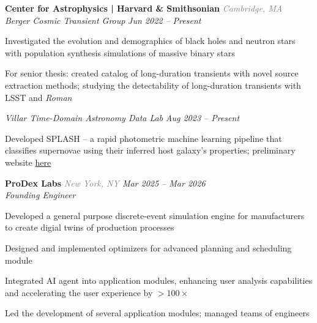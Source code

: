 \documentclass[12pt,letterpaper]{article}
\begin{document}
\textbf{Center for Astrophysics | Harvard \& Smithsonian} {\small\textit{\textcolor{gray}{Cambridge, MA}}}\\
\textit{Berger Cosmic Transient Group} {\small \textit{\hfill \textcolor{niceblue}{Jun 2022 -- Present}}}
\begin{bulletdescription}
      \item
            Investigated the evolution and demographics of black holes and neutron stars with population synthesis simulations of massive binary stars
      \item
            For senior thesis: created catalog of long-duration transients with novel source extraction methods; studying the detectability of long-duration transients with LSST and \textit{Roman}
\end{bulletdescription}
\textit{Villar Time-Domain Astronomy Data Lab} {\small \textit{\hfill \textcolor{niceblue}{Aug 2023 -- Present}}}
\begin{bulletdescription}
      \item
            Developed SPLASH -- a rapid photometric machine learning pipeline that classifies supernovae using their inferred host galaxy's properties; preliminary website \href{http://astrotimelab.com/_pages/splash.html}{here}
\end{bulletdescription}

\vspace{7pt}

\textbf{ProDex Labs} {\small\textit{\textcolor{gray}{New York, NY} \hfill \textcolor{niceblue}{Mar 2025 -- Mar 2026}}}\\
\textit{Founding Engineer}
\begin{bulletdescription}
      \item
            Developed a general purpose discrete-event simulation engine for manufacturers to create digial twins of production processes
      \item
            Designed and implemented optimizers for advanced planning and scheduling module
      \item
            Integrated AI agent into application modules, enhancing user analysis capabilities and accelerating the user experience by $>100\times$
      \item
            Led the development of several application modules; managed teams of engineers
\end{bulletdescription}

\vspace{7pt}
\end{document}
